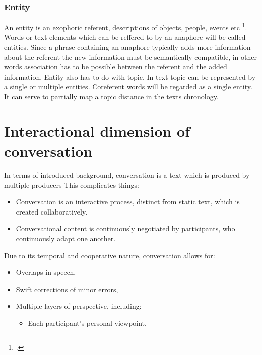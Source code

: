 \documentclass[12pt]{report}
\begin{document}
{\subsubsection{Entity}
\par
    An entity is an exophoric referent, descriptions of objects, people, events etc \footcite{entities}.
    Words or text elements which can be reffered to by an anaphore will be called entities.
    Since a phrase containing an anaphore typically adds more information about the referent
    the new information must be semantically compatible,
    in other words association has to be possible between the referent and the added information.
    Entity also has to do with topic.
    In text topic can be represented by a single or multiple entities.
    Coreferent words will be regarded as a single entity.
    It can serve to partially map a topic distance in the texts chronology.

\section{Interactional dimension of conversation}
\par
In terms of introduced background,
conversation is a text which is produced by multiple producers
This complicates things:

\begin{itemize}

    \item
    Conversation is an interactive process, distinct from static text, which is created collaboratively.

    \item
    Conversational content is continuously negotiated by participants, who continuously adapt one another.

\end{itemize}

Due to its temporal and cooperative nature, conversation allows for:
\begin{itemize}

    \item
    Overlaps in speech,

    \item
    Swift corrections of minor errors,

    \item
    Multiple layers of perspective, including:
        \begin{itemize}

            \item
            Each participant’s personal viewpoint,


\end{itemize}
\end{itemize}}
\end{document}
